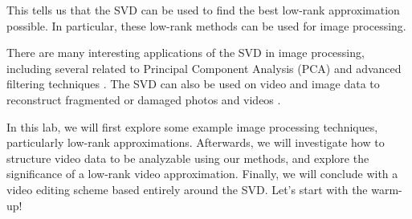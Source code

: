 This tells us that the SVD can be used to find the best low-rank approximation possible. In particular, these low-rank methods can be used for image processing. 

There are many interesting applications of the SVD in image processing, including several related to Principal Component Analysis (PCA) and advanced filtering techniques \cite{1162766}\cite{1326538}\cite{382496}. The SVD can also be used on video and image data to reconstruct fragmented or damaged photos and videos \cite{VideoRest}.

In this lab, we will first explore some example image processing techniques, particularly low-rank approximations. Afterwards, we will investigate how to structure video data to be analyzable using our methods, and explore the significance of a low-rank video approximation. Finally, we will conclude with a video editing scheme based entirely around the SVD. Let's start with the warm-up!